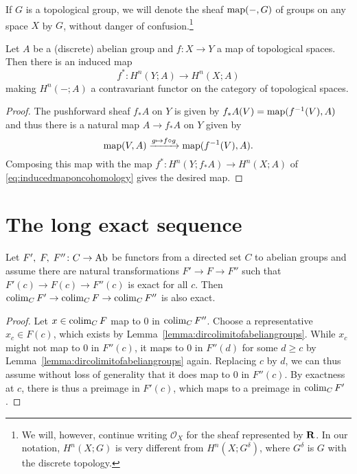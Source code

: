 \documentclass[a4paper,openany]{scrbook}
\begin{document}
If $G$ is a topological group, we will denote the sheaf $\operatorname{map}(-,G)$ of groups on any space $X$ by $G$, without danger of confusion.\footnote{We will, however, continue writing $\mathcal O_{X}$ for the sheaf represented by $\mathbf R$. In our notation, $H^n(X;G)$ is very different from $H^n(X;G^\delta)$, where $G^\delta$ is $G$ with the discrete topology.}

\begin{lemma}
Let $A$ be a (discrete) abelian group and $f\colon X \to Y$ a map of topological spaces. Then there is an induced map
\[
f^*\colon H^n(Y;A) \to H^n(X;A)
\]
making $H^n(-;A)$ a contravariant functor on the category of topological spaces.
\end{lemma}
\begin{proof}
The pushforward sheaf $f_*A$ on $Y$ is given by $f_*A(V) = \operatorname{map}(f^{-1}(V),A)$ and thus there is a natural map $A \to f_*A$ on $Y$ given by
\[
\operatorname{map}(V,A) \xrightarrow{g \mapsto f \circ g} \operatorname{map}(f^{-1}(V),A).
\] 
Composing this map with the map $f^*\colon H^n(Y;f_*A) \to H^n(X;A)$ of \eqref{eq:inducedmaponcohomology} gives the desired map.
\end{proof}

\section{The long exact sequence}

\begin{lemma}\label{lemma:colimexact}
Let $F', \; F,\; F''\colon C \to \operatorname{Ab}$ be functors from a directed set $C$ to abelian groups and assume there are natural transformations $F' \to F \to F''$ such that $F'(c) \to F(c) \to F''(c) $ is exact for all $c$. Then $\operatorname*{colim}_C F' \to \operatorname*{colim}_C F \to \operatorname*{colim}_C F''$ is also exact.
\end{lemma}
\begin{proof}
Let $x \in \operatorname*{colim}_C F$ map to $0$ in $\operatorname*{colim}_C F''$. Choose a representative $x_c \in F(c)$, which exists by Lemma~\ref{lemma:dircolimitofabeliangroups}. While $x_c$ might not map to $0$ in $F''(c)$, it maps to $0$ in $F''(d)$ for some $d \geq c$ by Lemma~\ref{lemma:dircolimitofabeliangroups} again. Replacing $c$ by $d$, we can thus assume without loss of generality that it does map to $0$ in $F''(c)$. By exactness at $c$, there is thus a preimage in $F'(c)$, which maps to a preimage in $\operatorname*{colim}_C F'$.
\end{proof}
\end{document}
